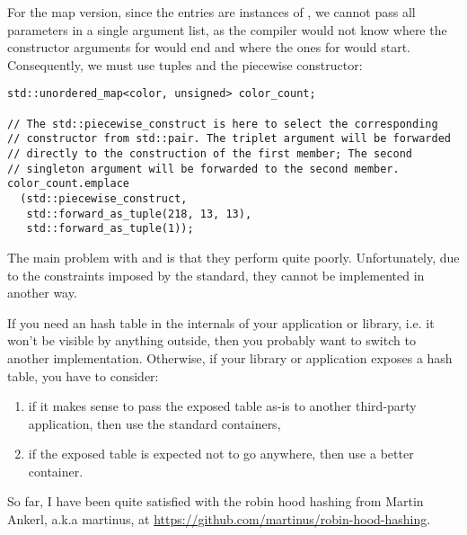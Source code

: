 For the map version, since the entries are instances of
, we cannot pass all parameters in a single argument
list, as the compiler would not know where the constructor arguments
for  would end and where the ones for
 would start. Consequently, we must use tuples
 and the piecewise constructor:

\begin{lstlisting}
std::unordered_map<color, unsigned> color_count;

// The std::piecewise_construct is here to select the corresponding
// constructor from std::pair. The triplet argument will be forwarded
// directly to the construction of the first member; The second
// singleton argument will be forwarded to the second member.
color_count.emplace
  (std::piecewise_construct,
   std::forward_as_tuple(218, 13, 13),
   std::forward_as_tuple(1));
\end{lstlisting}

The main problem with  and
 is that they perform quite
poorly. Unfortunately, due to the constraints imposed by the standard,
they cannot be implemented in another way.

\begin{guideline}
If you need an hash table in the internals of your application or
library, i.e. it won't be visible by anything outside, then you
probably want to switch to another implementation. Otherwise, if your
library or application exposes a hash table, you have to consider:

\begin{enumerate}
\item if it makes sense to pass the exposed table as-is to another
  third-party application, then use the standard containers,
\item if the exposed table is expected not to go anywhere, then use a
  better container.
\end{enumerate}

So far, I have been quite satisfied with the robin hood hashing from
Martin Ankerl, a.k.a martinus, at
\url{https://github.com/martinus/robin-hood-hashing}.
\end{guideline}
